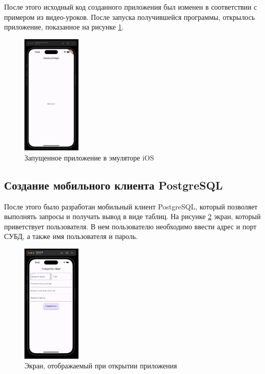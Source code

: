 \documentclass[a4paper, 14pt]{extarticle}
\begin{document}
После этого исходный код созданного приложения был изменен в соответствии с
примером из видео-уроков. После запуска получившейся программы, открылось
приложение, показанное на рисунке \ref{fig:task-1-3}.

\begin{figure}[H]
  \centering
  \includegraphics[width=0.25\textwidth]{images/task-1/3.png}
  \caption{Запущенное приложение в эмуляторе iOS}
  \label{fig:task-1-3}
\end{figure}

\subsection*{Создание мобильного клиента PostgreSQL}

После этого было разработан мобильный клиент PostgreSQL, который позволяет
выполнять запросы и получать вывод в виде таблиц. На рисунке \ref{fig:task-2-1}
экран, который приветствует пользователя. В нем пользователю необходимо ввести
адрес и порт СУБД, а также имя пользователя и пароль.

\begin{figure}[H]
  \centering
  \includegraphics[width=0.25\textwidth]{images/task-2/1.png}
  \caption{Экран, отображаемый при открытии приложения}
  \label{fig:task-2-1}
\end{figure}
\end{document}
